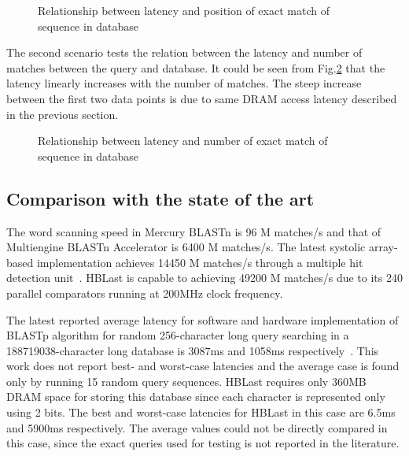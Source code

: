 \begin{figure}
\caption{Relationship between latency and position of exact match of sequence in database} \label{fig:plot1}
\end{figure}

The second scenario tests the relation between the latency and number of matches between the query and database. 
It could be seen from Fig.\ref{fig:plot2} that the latency linearly increases with the number of matches.
The steep increase between the first two data points is due to same DRAM access latency described in the previous section.

\begin{figure}
\caption{Relationship between latency and number of exact match of sequence in database} \label{fig:plot2}
\end{figure}

\subsection{Comparison with the state of the art}
The word scanning speed in Mercury BLASTn is 96 M matches/s and that of Multiengine BLASTn Accelerator is 6400 M matches/s. 
The latest systolic array-based implementation achieves 14450 M matches/s through a multiple hit detection unit~\cite{guo2012systolic}.
HBLast is capable to achieving 49200 M matches/s due to its 240 parallel comparators running at 200MHz clock frequency.

The latest reported average latency for software and hardware implementation of BLASTp algorithm for random 256-character long query searching in a 188719038-character long database is 3087ms and 1058ms respectively~\cite{guo2012systolic}.
This work does not report best- and worst-case latencies and the average case is found only by running 15 random query sequences.
HBLast requires only 360MB DRAM space for storing this database since each character is represented only using 2 bits.
The best and worst-case latencies for HBLast in this case are 6.5ms and 5900ms respectively.
The average values could not be directly compared in this case, since the exact queries used for testing is not reported in the literature.